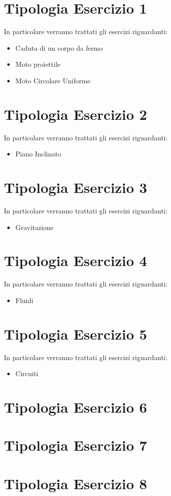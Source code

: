 \documentclass{article}
\begin{document}

\newpage

\tableofcontents

\newpage

\section{Tipologia Esercizio 1}
In particolare verranno trattati gli esercizi riguardanti:
\begin{itemize}
\item Caduta di un corpo da fermo
\item Moto proiettile
\item Moto Circolare Uniforme
\end{itemize}





\clearpage
\newpage
\section{Tipologia Esercizio 2}
In particolare verranno trattati gli esercizi riguardanti:
\begin{itemize}
\item Piano Inclinato 
\end{itemize}




\clearpage
\section{Tipologia Esercizio 3}
In particolare verranno trattati gli esercizi riguardanti:
\begin{itemize}
\item Gravitazione
\end{itemize}




\clearpage

\section{Tipologia Esercizio 4}
In particolare verranno trattati gli esercizi riguardanti:
\begin{itemize}
\item Fluidi
\end{itemize}




\clearpage
\section{Tipologia Esercizio 5}
In particolare verranno trattati gli esercizi riguardanti:
\begin{itemize}
\item Circuiti 
\end{itemize}



\clearpage
\section{Tipologia Esercizio 6}
\section{Tipologia Esercizio 7}
\section{Tipologia Esercizio 8}
\end{document}
